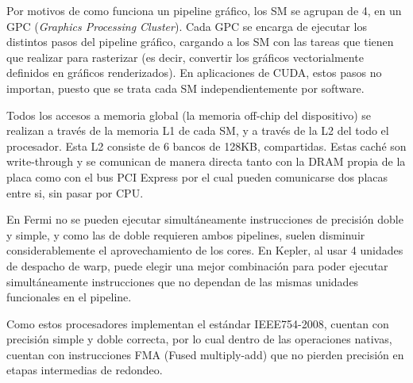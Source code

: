 Por motivos de como funciona un pipeline gr\'afico, los SM se agrupan de 4, en un GPC (\textit{Graphics
Processing Cluster}). Cada GPC se encarga de ejecutar los distintos pasos del pipeline gr\'afico,
cargando a los SM con las tareas que tienen que realizar para rasterizar (es decir, convertir los
gr\'aficos vectorialmente definidos en gr\'aficos renderizados). En aplicaciones de CUDA, estos pasos
no importan, puesto que se trata cada SM independientemente por software.

Todos los accesos a memoria global (la memoria off-chip del dispositivo) se realizan a trav\'es de la memoria
L1 de cada SM, y a trav\'es de la L2 del todo el procesador. Esta L2 consiste de 6 bancos de 128KB, compartidas.
Estas cach\'e son write-through y se comunican de manera directa tanto con la DRAM propia de la placa como
con el bus PCI Express por el cual pueden comunicarse dos placas entre si, sin pasar por CPU.

En Fermi no se pueden ejecutar simult\'aneamente instrucciones de precisi\'on doble y simple, y como
las de doble requieren ambos pipelines, suelen disminuir considerablemente el aprovechamiento
de los cores. En Kepler, al usar 4 unidades de despacho de warp, puede elegir una mejor
combinaci\'on para poder ejecutar simult\'aneamente instrucciones que no dependan de las mismas
unidades funcionales en el pipeline. ~\cite{NvidiaKepler}

Como estos procesadores implementan el est\'andar IEEE754-2008, cuentan con precisi\'on simple y
doble correcta, por lo cual dentro de las operaciones nativas, cuentan con instrucciones FMA
(Fused multiply-add) que no pierden precisi\'on en etapas intermedias de redondeo.




